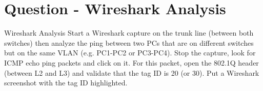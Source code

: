 \section{Question - Wireshark Analysis}

\begin{questionBox}{Wireshark Analysis}
    Start a Wireshark capture on the trunk line (between both switches) then analyze the ping between two PCs that are on different switches but on the same VLAN (e.g. PC1-PC2 or PC3-PC4). Stop the capture, look for ICMP echo ping packets and click on it. For this packet, open the 802.1Q header (between L2 and L3) and validate that the tag ID is 20 (or 30). Put a Wireshark screenshot with the tag ID highlighted.
\end{questionBox}
